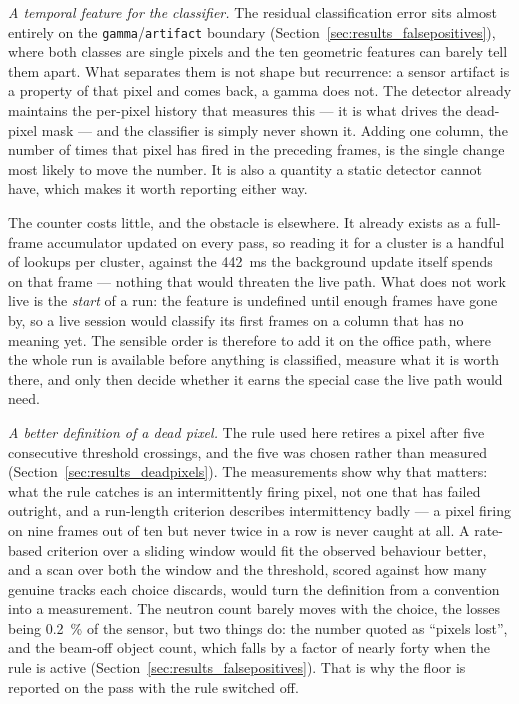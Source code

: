 \documentclass[a4paper,headsepline,oneside,11pt]{scrartcl}
\begin{document}
\emph{A temporal feature for the classifier.} The residual classification error
sits almost entirely on the \texttt{gamma}/\texttt{artifact} boundary
(Section~\ref{sec:results_falsepositives}), where both classes are single pixels
and the ten geometric features can barely tell them apart. What separates them is
not shape but recurrence: a sensor artifact is a property of that pixel and comes
back, a gamma does not. The detector already maintains the per-pixel history that
measures this --- it is what drives the dead-pixel mask --- and the classifier is
simply never shown it. Adding one column, the number of times that pixel has
fired in the preceding frames, is the single change most likely to move the
number. It is also a quantity a static detector cannot have, which makes it worth
reporting either way.

The counter costs little, and the obstacle is elsewhere. It
already exists as a full-frame accumulator updated on every pass, so reading it
for a cluster is a handful of lookups per cluster, against the \SI{442}{\milli\second} the
background update itself spends on that frame --- nothing that would threaten the
live path. What does not work live is the \emph{start} of a run: the feature is
undefined until enough frames have gone by, so a live session would classify its
first frames on a column that has no meaning yet. The sensible order is therefore
to add it on the office path, where the whole run is available before anything is
classified, measure what it is worth there, and only then decide whether it earns
the special case the live path would need.

\emph{A better definition of a dead pixel.} The rule used here retires a pixel
after five consecutive threshold crossings, and the five was chosen rather than
measured (Section~\ref{sec:results_deadpixels}). The measurements show why that
matters: what the rule catches is an intermittently firing pixel, not one that has
failed outright, and a run-length criterion describes intermittency badly --- a
pixel firing on nine frames out of ten but never twice in a row is never caught at
all. A rate-based criterion over a sliding window would fit the observed behaviour
better, and a scan over both the window and the threshold, scored against how many
genuine tracks each choice discards, would turn the definition from a convention
into a measurement. The neutron count barely moves with the choice, the losses
being \SI{0.2}{\percent} of the sensor, but two things do: the number quoted as
``pixels lost'', and the beam-off object count, which falls by a factor of
nearly forty when the rule is active (Section~\ref{sec:results_falsepositives}).
That is why the floor is reported on the pass with the rule switched off.
\end{document}
